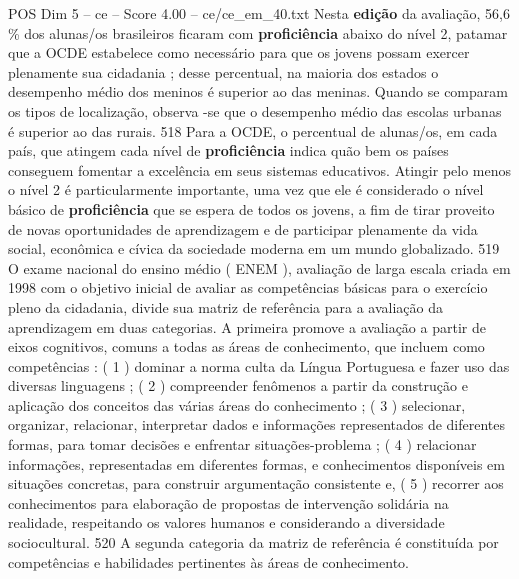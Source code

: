 \begin{textsample}{POS Dim 5 – ce – Score 4.00 – ce/ce\_em\_40.txt}
Nesta \textbf{edição} da avaliação, 56,6 \% dos alunas/os brasileiros ficaram com \textbf{proficiência} abaixo do nível 2, patamar que a OCDE estabelece como necessário para que os jovens possam exercer plenamente sua cidadania ; desse percentual, na maioria dos estados o desempenho médio dos meninos é superior ao das meninas.
Quando se comparam os tipos de localização, observa -se que o desempenho médio das escolas urbanas é superior ao das rurais. 518 Para a OCDE, o percentual de alunas/os, em cada país, que atingem cada nível de \textbf{proficiência} indica quão bem os países conseguem fomentar a excelência em seus sistemas educativos.
Atingir pelo menos o nível 2 é particularmente importante, uma vez que ele é considerado o nível básico de \textbf{proficiência} que se espera de todos os jovens, a fim de tirar proveito de novas oportunidades de aprendizagem e de participar plenamente da vida social, econômica e cívica da sociedade moderna em um mundo globalizado. 519 O exame nacional do ensino médio ( ENEM ), avaliação de larga escala criada em 1998 com o objetivo inicial de avaliar as competências básicas para o exercício pleno da cidadania, divide sua matriz de referência para a avaliação da aprendizagem em duas categorias.
A primeira promove a avaliação a partir de eixos cognitivos, comuns a todas as áreas de conhecimento, que incluem como competências : ( 1 ) dominar a norma culta da Língua Portuguesa e fazer uso das diversas linguagens ; ( 2 ) compreender fenômenos a partir da construção e aplicação dos conceitos das várias áreas do conhecimento ; ( 3 ) selecionar, organizar, relacionar, interpretar dados e informações representados de diferentes formas, para tomar decisões e enfrentar situações-problema ; ( 4 ) relacionar informações, representadas em diferentes formas, e conhecimentos disponíveis em situações concretas, para construir argumentação consistente e, ( 5 ) recorrer aos conhecimentos para elaboração de propostas de intervenção solidária na realidade, respeitando os valores humanos e considerando a diversidade sociocultural. 520 A segunda categoria da matriz de referência é constituída por competências e habilidades pertinentes às áreas de conhecimento.

\end{textsample}
